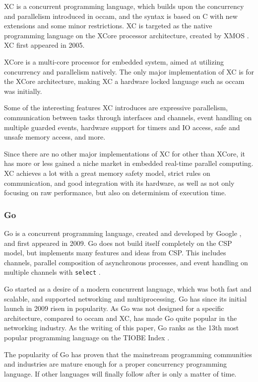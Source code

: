 XC is a concurrent programming language, which builds upon the concurrency and parallelism introduced in occam, and the syntax is based on C with new extensions and some minor restrictions. XC is targeted as the native programming language on the XCore processor architecture, created by XMOS \citep{xc}. XC first appeared in 2005.

XCore is a multi-core processor for embedded system, aimed at utilizing concurrency and parallelism natively. The only major implementation of XC is for the XCore architecture, making XC a hardware locked language such as occam was initially. 

Some of the interesting features XC introduces are expressive parallelism, communication between tasks through interfaces and channels, event handling on multiple guarded events, hardware support for timers and IO access, safe and unsafe memory access, and more.

Since there are no other major implementations of XC for other than XCore, it has more or less gained a niche market in embedded real-time parallel computing. XC achieves a lot with a great memory safety model, strict rules on communication, and good integration with its hardware, as well as not only focusing on raw performance, but also on determinism of execution time. 

\subsubsection{Go}
\label{sssec:go}

Go is a concurrent programming language, created and developed by Google \citep{golangintro}, and first appeared in 2009. Go does not build itself completely on the CSP model, but implements many features and ideas from CSP. This includes channels, parallel composition of asynchronous processes, and event handling on multiple channels with \texttt{select} \citep{golangspec}.

Go started as a desire of a modern concurrent language, which was both fast and scalable, and supported networking and multiprocessing. Go has since its initial launch in 2009 risen in popularity. As Go was not designed for a specific architecture, compared to occam and XC, has made Go quite popular in the networking industry. As the writing of this paper, Go ranks as the 13th most popular programming language on the TIOBE Index \citep{gopopularity}.

The popularity of Go has proven that the mainstream programming communities and industries are mature enough for a proper concurrency programming language. If other languages will finally follow after is only a matter of time.


